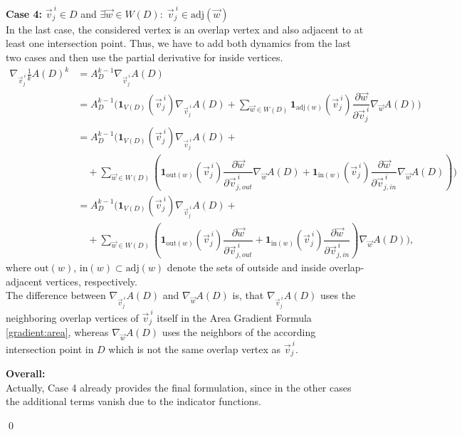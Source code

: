 \begin{proposition}
	\textbf{Case 4:} $\vec{v}_j^{\: i} \in D$ and $\exists \vec{w} \in W(D): \; \vec{v}_j^{\: i} \in \text{adj}(\vec{w})$\\
	In the last case, the considered vertex is an overlap vertex and also adjacent to at least one intersection point. 
	Thus, we have to add both dynamics from the last two cases and then use the partial derivative for inside vertices. 
	\begin{align*}
		\nabla_{\vec{v}_j^{\: i}} \frac{1}{k} A(D)^k 
		&= A_{D}^{k-1} \nabla_{\vec{v}_j^{\: i}} A(D) \\
		&= A_{D}^{k-1} \Biggl(\mathbf{1}_{V(D)}(\vec{v}_j^{\: i}) \nabla_{\vec{v}_j^{\: i}}A(D) %
							+ \sum\limits_{\vec{w} \in W(D)} \mathbf{1}_{\text{adj}(w)}(\vec{v}_j^{\: i}) \dfrac{\partial \vec{w}}{\partial \vec{v}_j^{\: i}}\nabla_{\vec{w}}A(D) \Biggr)\\[0.5em]
		&= A_{D}^{k-1} \Biggl(\mathbf{1}_{V(D)}(\vec{v}_j^{\: i}) \nabla_{\vec{v}_j^{\: i}}A(D) + \\[0.5em]
							 &\quad + \sum\limits_{\vec{w} \in W(D)} \left(\mathbf{1}_{\text{out}(w)}(\vec{v}_{j}^{\: i}) \dfrac{\partial \vec{w}}{\partial \vec{v}_{j, out}^{\: i}}\nabla_{\vec{w}}A(D) %
		+ \mathbf{1}_{\text{in}(w)}(\vec{v}_j^{\: i}) \dfrac{\partial \vec{w}}{\partial \vec{v}_{j, in}^{\: i}}\nabla_{\vec{w}}A(D)\right) \Biggr)\\[0.5em]
		&= A_{D}^{k-1} \Biggl(\mathbf{1}_{V(D)}(\vec{v}_j^{\: i}) \nabla_{\vec{v}_j^{\: i}}A(D)  + \\[0.5em]
							 &\quad + \sum\limits_{\vec{w} \in W(D)} \left(\mathbf{1}_{\text{out}(w)}(\vec{v}_{j}^{\: i}) \dfrac{\partial \vec{w}}{\partial \vec{v}_{j, out}^{\: i}} %
		+ \mathbf{1}_{\text{in}(w)}(\vec{v}_j^{\: i}) \dfrac{\partial \vec{w}}{\partial \vec{v}_{j, in}^{\: i}} \right) \nabla_{\vec{w}}A(D)\Biggr),
	\end{align*}
	where $\text{out}(w)$, $\text{in}(w) \subset \text{adj}(w)$ denote the sets of outside and inside overlap-adjacent vertices, respectively.\\
	The difference between $\nabla_{\vec{v}_j^{\: i}}A(D)$ and $\nabla_{\vec{w}}A(D)$ is, that $\nabla_{\vec{v}_j^{\: i}}A(D)$ uses the neighboring overlap vertices of $\vec{v}_j^{\: i}$ itself in the Area Gradient Formula \ref{gradient:area}, whereas $\nabla_{\vec{w}}A(D)$ uses the neighbors of the according intersection point in $D$ which is not the same overlap vertex as $\vec{v}_j^{\: i}$. 
	
	\textbf{Overall:}\\
	Actually, Case 4 already provides the final formulation, since in the other cases the additional terms vanish due to the indicator functions.
		
	\qed
\end{proposition}

